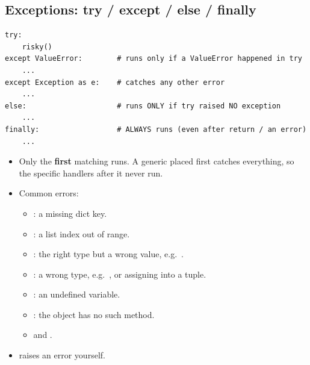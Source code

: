 \subsection{Exceptions: try / except / else / finally}
\begin{codebox}
\begin{Verbatim}
try:
    risky()
except ValueError:        # runs only if a ValueError happened in try
    ...
except Exception as e:    # catches any other error
    ...
else:                     # runs ONLY if try raised NO exception
    ...
finally:                  # ALWAYS runs (even after return / an error)
    ...
\end{Verbatim}
\end{codebox}
\begin{itemize}
  \item Only the \textbf{first} matching  runs. A generic  placed first catches everything, so the specific handlers after it never run.
  \item Common errors:
  \begin{itemize}
    \item {}: a missing dict key.
    \item {}: a list index out of range.
    \item {}: the right type but a wrong value, e.g.\ .
    \item {}: a wrong type, e.g.\ , or assigning into a tuple.
    \item {}: an undefined variable.
    \item {}: the object has no such method.
    \item {} and .
  \end{itemize}
  \item {} raises an error yourself.
\end{itemize}

